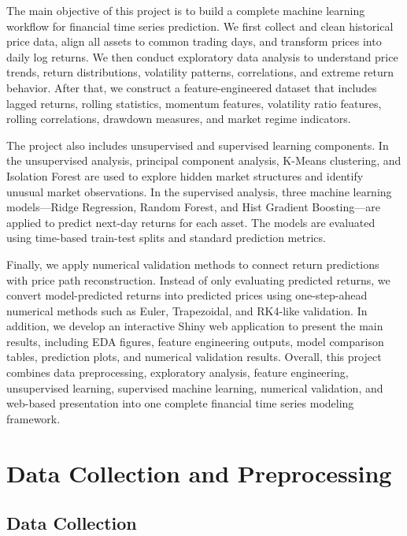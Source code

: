 \documentclass[12pt]{article}
\begin{document}
The main objective of this project is to build a complete machine learning workflow for financial time series prediction. We first collect and clean historical price data, align all assets to common trading days, and transform prices into daily log returns. We then conduct exploratory data analysis to understand price trends, return distributions, volatility patterns, correlations, and extreme return behavior. After that, we construct a feature-engineered dataset that includes lagged returns, rolling statistics, momentum features, volatility ratio features, rolling correlations, drawdown measures, and market regime indicators.

The project also includes unsupervised and supervised learning components. In the unsupervised analysis, principal component analysis, K-Means clustering, and Isolation Forest are used to explore hidden market structures and identify unusual market observations. In the supervised analysis, three machine learning models---Ridge Regression, Random Forest, and Hist Gradient Boosting---are applied to predict next-day returns for each asset. The models are evaluated using time-based train-test splits and standard prediction metrics.

Finally, we apply numerical validation methods to connect return predictions with price path reconstruction. Instead of only evaluating predicted returns, we convert model-predicted returns into predicted prices using one-step-ahead numerical methods such as Euler, Trapezoidal, and RK4-like validation. In addition, we develop an interactive Shiny web application to present the main results, including EDA figures, feature engineering outputs, model comparison tables, prediction plots, and numerical validation results. Overall, this project combines data preprocessing, exploratory analysis, feature engineering, unsupervised learning, supervised machine learning, numerical validation, and web-based presentation into one complete financial time series modeling framework.


\section{Data Collection and Preprocessing}

\subsection{Data Collection}
\end{document}

